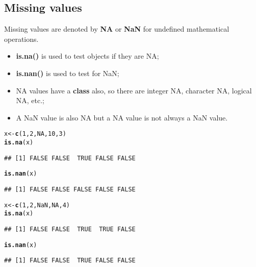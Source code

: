 \documentclass[10pt,a4paper,twoside]{article}\usepackage[]{graphicx}\usepackage[]{xcolor}
\makeatletter
\newcommand{\hlnum}[1]{\textcolor[rgb]{0.686,0.059,0.569}{#1}}%
\newcommand{\hldef}[1]{\textcolor[rgb]{0.345,0.345,0.345}{#1}}%
\newcommand{\hlkwb}[1]{\textcolor[rgb]{0.69,0.353,0.396}{#1}}%
\newcommand{\hlkwd}[1]{\textcolor[rgb]{0.737,0.353,0.396}{\textbf{#1}}}%
\newenvironment{kframe}{%
 \def\at@end@of@kframe{}%
 \ifinner\ifhmode%
  \def\at@end@of@kframe{\end{minipage}}%
  \begin{minipage}{\columnwidth}%
 \fi\fi%
 \def\FrameCommand##1{\hskip\@totalleftmargin \hskip-\fboxsep
 \colorbox{shadecolor}{##1}\hskip-\fboxsep
     \hskip-\linewidth \hskip-\@totalleftmargin \hskip\columnwidth}%
 \MakeFramed {\advance\hsize-\width
   \@totalleftmargin\z@ \linewidth\hsize
   \@setminipage}}%
 {\par\unskip\endMakeFramed%
 \at@end@of@kframe}
\newenvironment{knitrout}{}{} %
\makeatother
\begin{document}
\subsection{Missing values}

Missing values are denoted by \textbf{NA} or \textbf{NaN} for undefined mathematical operations.

\begin{itemize}
  \item \textbf{is.na()} is used to test objects if they are NA;
  \item \textbf{is.nan()} is used to test for NaN;
  \item NA values have a \textbf{class} also, so there are integer NA, character NA, logical NA, etc.;
  \item A NaN value is also NA but a NA value is not always a NaN value.
\end{itemize}

\begin{knitrout}
\color{fgcolor}\begin{kframe}
\begin{alltt}
\hldef{x} \hlkwb{<-} \hlkwd{c}\hldef{(}\hlnum{1}\hldef{,} \hlnum{2}\hldef{,} \hlnum{NA}\hldef{,} \hlnum{10}\hldef{,} \hlnum{3}\hldef{)}
\hlkwd{is.na}\hldef{(x)}
\end{alltt}
\begin{verbatim}
## [1] FALSE FALSE  TRUE FALSE FALSE
\end{verbatim}
\begin{alltt}
\hlkwd{is.nan}\hldef{(x)}
\end{alltt}
\begin{verbatim}
## [1] FALSE FALSE FALSE FALSE FALSE
\end{verbatim}
\begin{alltt}
\hldef{x} \hlkwb{<-} \hlkwd{c}\hldef{(}\hlnum{1}\hldef{,} \hlnum{2}\hldef{,} \hlnum{NaN}\hldef{,} \hlnum{NA}\hldef{,} \hlnum{4}\hldef{)}
\hlkwd{is.na}\hldef{(x)}
\end{alltt}
\begin{verbatim}
## [1] FALSE FALSE  TRUE  TRUE FALSE
\end{verbatim}
\begin{alltt}
\hlkwd{is.nan}\hldef{(x)}
\end{alltt}
\begin{verbatim}
## [1] FALSE FALSE  TRUE FALSE FALSE
\end{verbatim}
\end{kframe}
\end{knitrout}
\end{document}
